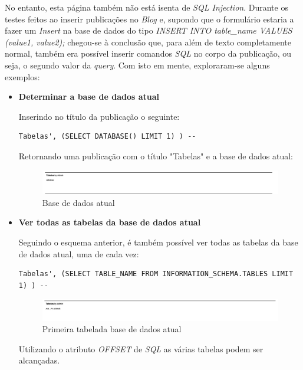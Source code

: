 \documentclass[10pt,english]{article}
\begin{document}
\begin{itemize}
    \par No entanto, esta página também não está isenta de \textit{SQL Injection}. Durante os testes feitos ao inserir publicações no \textit{Blog} e, supondo que o formulário estaria a fazer um \textit{Insert} na base de dados do tipo \textit{INSERT INTO table\_name VALUES (value1, value2);} chegou-se à conclusão que, para além de texto completamente normal, também era possível inserir comandos \textit{SQL} no corpo da publicação, ou seja, o segundo valor da \textit{query}. Com isto em mente, exploraram-se alguns exemplos:
    
    \begin{itemize}
        \item \textbf{Determinar a base de dados atual}
        
        \par Inserindo no título da publicação o seguinte:
        \begin{lstlisting}
Tabelas', (SELECT DATABASE() LIMIT 1) ) -- 
        \end{lstlisting}
        
        \par Retornando uma publicação com o título "Tabelas" e a base de dados atual:
         \begin{figure}[!h]
        \centering
        \includegraphics[width=\textwidth]{images/db_sql.png}
        \caption{Base de dados atual}
    \end{figure}
    
    \item \textbf{Ver todas as tabelas da base de dados atual}
    
    \par Seguindo o esquema anterior, é também possível ver todas as tabelas da base de dados atual, uma de cada vez:
    \begin{lstlisting}
Tabelas', (SELECT TABLE_NAME FROM INFORMATION_SCHEMA.TABLES LIMIT 1) ) --
    \end{lstlisting}
        
    
    
    \begin{figure}[!h]
        \centering
        \includegraphics[width=\textwidth]{images/db_sql_2.png}
        \caption{Primeira tabelada base de dados atual}
    \end{figure}
    \par Utilizando o atributo \textit{OFFSET} de \textit{SQL} as várias tabelas podem ser alcançadas.
    

\end{itemize}
\end{itemize}
\end{document}
